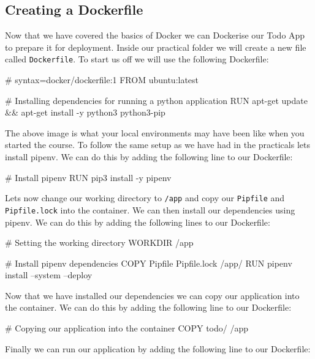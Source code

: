 \documentclass{csse4400}
\begin{document}
\subsection{Creating a Dockerfile}

Now that we have covered the basics of Docker we can Dockerise our Todo App to prepare it for deployment. Inside our practical folder we will create a new file called \texttt{Dockerfile}. To start us off we will use the following Dockerfile:

\begin{code}[language=docker,numbers=none]{}
  # syntax=docker/dockerfile:1
  FROM ubuntu:latest

  # Installing dependencies for running a python application
  RUN apt-get update && apt-get install -y python3 python3-pip
\end{code}

The above image is what your local environments may have been like when you started the course. To follow the same setup as we have had in the practicals lets install pipenv. We can do this by adding the following line to our Dockerfile:

\begin{code}[language=docker,numbers=none]{}
  # Install pipenv
  RUN pip3 install -y pipenv
\end{code}

Lets now change our working directory to \texttt{/app} and copy our \texttt{Pipfile} and \texttt{Pipfile.lock} into the container. We can then install our dependencies using pipenv. We can do this by adding the following lines to our Dockerfile:

\begin{code}[language=docker,numbers=none]{}
  # Setting the working directory
  WORKDIR /app

  # Install pipenv dependencies
  COPY Pipfile Pipfile.lock /app/
  RUN pipenv install --system --deploy
\end{code}

Now that we have installed our dependencies we can copy our application into the container. We can do this by adding the following line to our Dockerfile:

\begin{code}[language=docker,numbers=none]{}
  # Copying our application into the container
  COPY todo/ /app

\end{code}

Finally we can run our application by adding the following line to our Dockerfile:
\end{document}
